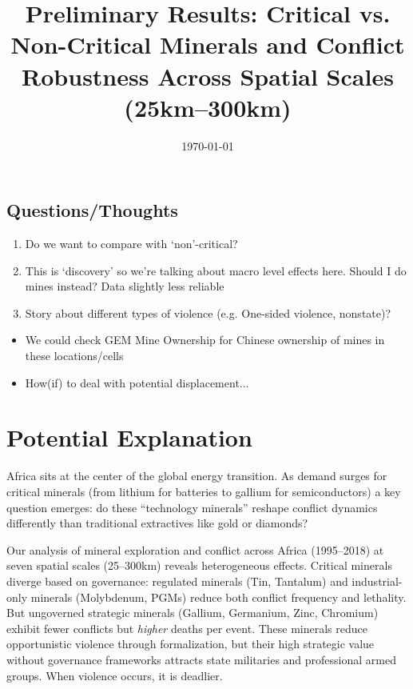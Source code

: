 \documentclass[11pt]{article}
\title{Preliminary Results: Critical vs. Non-Critical Minerals and Conflict\\
\large Robustness Across Spatial Scales (25km--300km)}
\author{}
\date{\today}
\begin{document}
\maketitle

\subsection*{Questions/Thoughts}
\begin{enumerate}
    \item Do we want to compare with `non'-critical? 
	\item This is ‘discovery’ so we’re talking about macro level effects here. Should I do mines instead? Data slightly less reliable
    \item Story about different types of violence (e.g. One-sided violence, nonstate)?
\end{enumerate}

\begin{itemize}
    \item We could check GEM Mine Ownership for Chinese ownership of mines in these locations/cells
    \item How(if) to deal with potential displacement...
\end{itemize}

\section{Potential Explanation}

Africa sits at the center of the global energy transition. As demand surges for critical minerals (from lithium for batteries to gallium for semiconductors) a key question emerges: do these ``technology minerals'' reshape conflict dynamics differently than traditional extractives like gold or diamonds?

Our analysis of mineral exploration and conflict across Africa (1995--2018) at seven spatial scales (25--300km) reveals heterogeneous effects. Critical minerals diverge based on governance: regulated minerals (Tin, Tantalum) and industrial-only minerals (Molybdenum, PGMs) reduce both conflict frequency and lethality. But ungoverned strategic minerals (Gallium, Germanium, Zinc, Chromium) exhibit fewer conflicts but \textit{higher} deaths per event. These minerals reduce opportunistic violence through formalization, but their high strategic value without governance frameworks attracts state militaries and professional armed groups. When violence occurs, it is deadlier.
\end{document}
